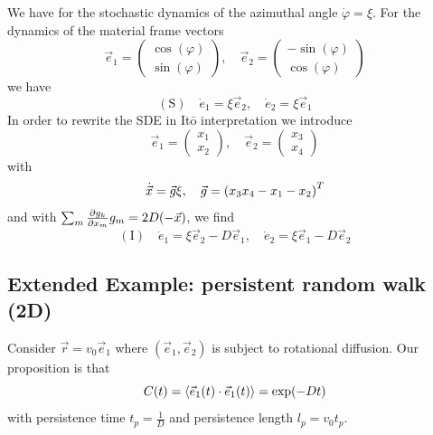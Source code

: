 \documentclass{/home/ben/Templates/notebook}
\begin{document}
	We have for the stochastic dynamics of the azimuthal angle $\dot{\varphi} = \xi$. For the dynamics of the material frame vectors
	\begin{equation*}
		\vec{e}_1 = \begin{pmatrix} \cos(\varphi) \\ \sin(\varphi) \end{pmatrix}, \quad 
		\vec{e}_2 = \begin{pmatrix} -\sin(\varphi) \\ \cos(\varphi) \end{pmatrix}
	\end{equation*}
	we have 
	\begin{equation}
	\mathrm{(S)} \quad \dot{e}_1 = \xi \vec{e}_2, \quad \dot{e}_2 = \xi \vec{e}_1
	\end{equation}
	In order to rewrite the SDE in It$\bar{\mathrm{o}}$ interpretation we introduce
	\begin{equation*}
		\vec{e}_1 = \begin{pmatrix} x_1 \\ x_2 \end{pmatrix}, \quad 
		\vec{e}_2 = \begin{pmatrix} x_3 \\ x_4 \end{pmatrix}
	\end{equation*}
	with
	\begin{equation*}
		\dot{\vec{x}} = \vec{g} \xi, \quad 
		\vec{g} = \left(x_3 \\ x_4 \\ -x_1 \\ -x_2 \right)^T
	\end{equation*}
	and with $\sum_m \pdv{g_k}{x_m} g_m = 2 D(-\vec{x})$, we find
	\begin{equation}
	\mathrm{(I)} \quad \dot{e}_1 = \xi \vec{e}_2 - D \vec{e}_1, \quad \dot{e}_2 = \xi \vec{e}_1 - D \vec{e}_2
	\end{equation}
	
	\subsection*{Extended Example: persistent random walk (2D)}
	
	Consider $\vec{r} = v_0 \vec{e}_1$ where $(\vec{e}_1, \vec{e}_2)$ is subject to rotational diffusion. Our proposition is that
	\begin{equation}
	C(t) = \expval{\vec{e}_1(t) \cdot \vec{e}_1(t)} = \exp(- D t)
	\end{equation}
	with persistence time $t_p = \frac{1}{D}$ and persistence length $l_p = v_0 t_p$. 
	
\end{document}

